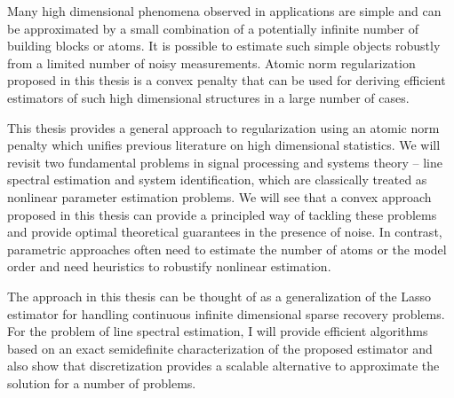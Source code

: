{\small 
Many high dimensional phenomena observed in applications are simple and can be
approximated by a small combination of a potentially infinite number of building
blocks or atoms. It is possible to estimate such simple objects robustly from a
limited number of noisy measurements. Atomic norm regularization proposed in
this thesis is a convex penalty that can be used for deriving efficient
estimators of such high dimensional structures in a large number of cases.

This thesis provides a general approach to regularization using an atomic norm
penalty which unifies previous literature on high dimensional statistics. We
will revisit two fundamental problems in signal processing and systems theory --
line spectral estimation and system identification, which are classically
treated as nonlinear parameter estimation problems. We will see that a convex
approach proposed in this thesis can provide a principled way of tackling these
problems and provide optimal theoretical guarantees in the presence of noise. In
contrast, parametric approaches often need to estimate the number of atoms or
the model order and need heuristics to robustify nonlinear estimation.

The approach in this thesis can be thought of as a generalization of the Lasso
estimator for handling continuous infinite dimensional sparse recovery problems.
For the problem of line spectral estimation, I will provide efficient algorithms
based on an exact semidefinite characterization of the proposed estimator and
also show that discretization provides a scalable alternative to approximate the
solution for a number of problems.
}
